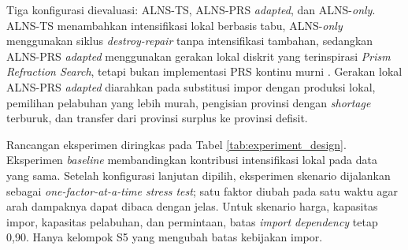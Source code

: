 \documentclass[journal]{IEEEtran}
\theoremstyle{definition}
\theoremstyle{definition}
\theoremstyle{plain}
\begin{document}
    Tiga konfigurasi dievaluasi: ALNS-TS, ALNS-PRS \textit{adapted}, dan ALNS-\textit{only}. ALNS-TS menambahkan intensifikasi lokal berbasis tabu, ALNS-\textit{only} menggunakan siklus \textit{destroy-repair} tanpa intensifikasi tambahan, sedangkan ALNS-PRS \textit{adapted} menggunakan gerakan lokal diskrit yang terinspirasi \textit{Prism Refraction Search}, tetapi bukan implementasi PRS kontinu murni \cite{kundu2024prism}. Gerakan lokal ALNS-PRS \textit{adapted} diarahkan pada substitusi impor dengan produksi lokal, pemilihan pelabuhan yang lebih murah, pengisian provinsi dengan \textit{shortage} terburuk, dan transfer dari provinsi surplus ke provinsi defisit.

    Rancangan eksperimen diringkas pada Tabel \ref{tab:experiment_design}. Eksperimen \textit{baseline} membandingkan kontribusi intensifikasi lokal pada data yang sama. Setelah konfigurasi lanjutan dipilih, eksperimen skenario dijalankan sebagai \textit{one-factor-at-a-time stress test}; satu faktor diubah pada satu waktu agar arah dampaknya dapat dibaca dengan jelas. Untuk skenario harga, kapasitas impor, kapasitas pelabuhan, dan permintaan, batas \textit{import dependency} tetap 0,90. Hanya kelompok S5 yang mengubah batas kebijakan impor.

    \begin{table}[H]
    \centering
    \caption{Rancangan eksperimen komputasi}
    \label{tab:experiment_design}
    \end{table}
\end{document}
